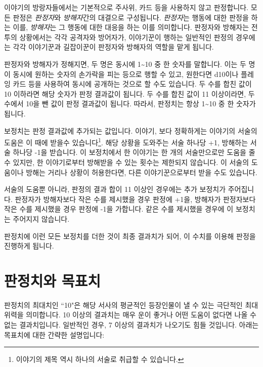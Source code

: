 \documentclass{report}
\begin{document}
	이야기의 방랑자들에서는 기본적으로 주사위, 카드 등을 사용하지 않고 판정합니다. 모든 판정은 \emph{판정자}와 \emph{방해자}간의 대결으로 구성됩니다. \emph{판정자}는 행동에 대한 판정을 하는 이를, \emph{방해자}는 그 행동에 대한 대응을 하는 이를 의미합니다. 판정자와 방해자는 전투의 상황에서는 각각 공격자와 방어자가, 이야기꾼이 행하는 일반적인 판정의 경우에는 각각 이야기꾼과 길잡이꾼이 판정자와 방해자의 역할을 맡게 됩니다.
	
	판정자와 방해자가 정해지면, 두 명은 동시에 1\textasciitilde10 중 한 숫자를 말합니다. 이는 두 명이 동시에 원하는 숫자의 손가락을 피는 등으로 행할 수 있고, 원한다면 d10이나 플레잉 카드 등을 사용하여 동시에 공개하는 것으로 할 수도 있습니다. 두 수를 합친 값이 10 이하라면 해당 숫자가 판정 결과값이 됩니다. 두 수를 합친 값이 11 이상이라면, 두 수에서 10을 뺀 값이 판정 결과값이 됩니다. 따라서, 판정치는 항상 1\textasciitilde10 중 한 숫자가 됩니다.
	
	보정치는 판정 결과값에 추가되는 값입니다. 이야기, 보다 정확하게는 이야기의 서술의 도움은 이 때에 받을수 있습니다\footnote{이야기의 제목 역시 하나의 서술로 취급할 수 있습니다.}. 해당 상황을 도와주는 서술 하나당 +1, 방해하는 서술 하나당 -1을 받습니다. 이 보정치에서 한 이야기는 한 개의 서술만으로만 도움을 줄 수 있지만, 한 이야기로부터 방해받을 수 있는 횟수는 제한되지 않습니다. 이 서술의 도움이나 방해는 거리나 상황이 허용한다면, 다른 이야기꾼으로부터 받을 수도 있습니다.
	
	서술의 도움뿐 아니라, 판정의 결과 합이 11 이상인 경우에는 추가 보정치가 주어집니다. 판정자가 방해자보다 작은 수를 제시했을 경우 판정에 +1을, 방해자가 판정자보다 작은 수를 제시했을 경우 판정에 -1을 가합니다. 같은 수를 제시했을 경우에 이 보정치는 주어지지 않습니다.
	
	판정치에 이런 모든 보정치를 더한 것이 최종 결과치가 되어, 이 수치를 이용해 판정을 진행하게 됩니다.
	
	\section*{판정치와 목표치}
	판정치의 최대치인 ``10"은 해당 서사의 평균적인 등장인물이 낼 수 있는 극단적인 최대 위력을 의미합니다. 10 이상의 결과치는 매우 운이 좋거나 어떤 도움이 없다면 나올 수 없는 결과치입니다. 일반적인 경우, 7 이상의 결과치가 나오기도 힘들 것입니다. 아래는 목표치에 대한 간략한 설명입니다:
	
\end{document}
